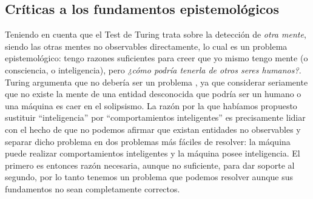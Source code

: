 \documentclass[12pt]{memoir}
\begin{document}
\subsection{Críticas a los fundamentos epistemológicos}

Teniendo en cuenta que el Test de Turing trata sobre la detección de \textit{otra mente}, siendo las otras mentes no observables directamente, lo cual es un problema epistemológico: tengo razones suficientes para creer que yo mismo tengo mente (o consciencia, o inteligencia), pero \textit{¿cómo podría tenerla de otros seres humanos?}. Turing argumenta que no debería ser un problema \parencite[apartado 6, punto 4]{Turing1950cmi}, ya que considerar seriamente que no existe la mente de una entidad desconocida que podría ser un humano o una máquina es caer en el solipsismo. La razón por la que habíamos propuesto sustituir ``inteligencia'' por ``comportamientos inteligentes'' es precisamente lidiar con el hecho de que no podemos afirmar que existan entidades no observables y separar dicho problema en dos problemas más fáciles de resolver: la máquina puede realizar comportamientos inteligentes y la máquina posee inteligencia. El primero es entonces razón necesaria, aunque no suficiente, para dar soporte al segundo, por lo tanto tenemos un problema que podemos resolver aunque sus fundamentos no sean completamente correctos.
\end{document}

